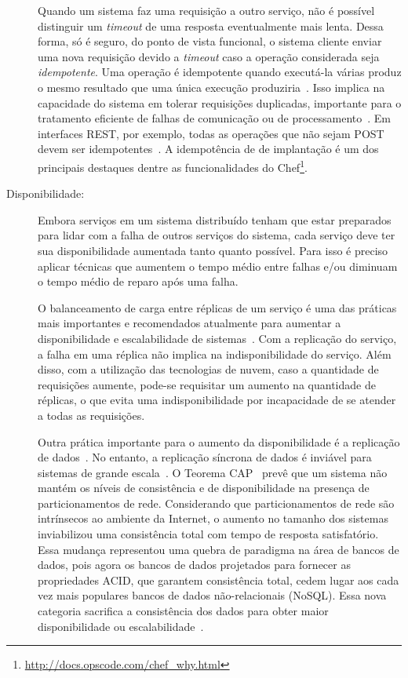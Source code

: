 \begin{description}
Quando um sistema faz uma requisição a outro serviço, não é possível distinguir um \emph{timeout} de uma resposta eventualmente mais lenta. Dessa forma, só é seguro, do ponto de vista funcional, o sistema cliente enviar uma nova requisição devido a \emph{timeout} caso a operação considerada seja \emph{idempotente}. 
Uma operação é idempotente quando executá-la várias produz o mesmo resultado 
que uma única execução produziria~\cite{Weider2007QoSWS}.
Isso implica na capacidade do sistema em tolerar requisições duplicadas,
importante para o tratamento eficiente de falhas de comunicação 
ou de processamento~\cite{Ramalingam2013Idempotence}.
Em interfaces REST, por exemplo, todas as operações que não sejam POST devem ser idempotentes~\cite{Allamaraju2010REST}. A idempotência de \scripts
de implantação é um dos principais destaques dentre as funcionalidades do 
Chef\footnote{\url{http://docs.opscode.com/chef_why.html}}.

\item [Disponibilidade:]

Embora serviços em um sistema distribuído tenham que estar preparados para lidar
com a falha de outros serviços do sistema,
cada serviço deve ter sua disponibilidade aumentada tanto quanto possível. 
Para isso é preciso aplicar técnicas que
aumentem o tempo médio entre falhas e/ou diminuam o tempo médio de reparo após uma falha.

O balanceamento de carga entre réplicas de um serviço é uma das práticas mais importantes e 
recomendados atualmente para aumentar a disponibilidade e escalabilidade de sistemas~\cite{Amazon2012Practices}.
Com a replicação do serviço, a falha em uma réplica não implica na indisponibilidade
do serviço. Além disso, com a utilização das tecnologias de nuvem,
caso a quantidade de requisições aumente, pode-se requisitar um aumento na quantidade de réplicas,
o que evita uma indisponibilidade por incapacidade de se atender a todas as requisições.

Outra prática importante para o aumento da disponibilidade é a replicação de dados~\cite{Brewer2001GiantScale}.
No entanto, a replicação síncrona de dados é inviável para sistemas de grande escala~\cite{Helland2009Quicksand}.
O Teorema CAP~\cite{Brewer2012Cap} prevê que um sistema não mantém os níveis de consistência e de disponibilidade na presença de particionamentos de rede. Considerando que particionamentos de rede são intrínsecos ao ambiente da Internet, o aumento no tamanho dos sistemas inviabilizou uma consistência total com tempo de resposta satisfatório. 
Essa mudança representou uma quebra de paradigma na área de bancos de dados,
pois agora os bancos de dados projetados para fornecer as propriedades ACID,
que garantem consistência total, cedem lugar aos cada vez mais populares
bancos de dados não-relacionais (NoSQL).
Essa nova categoria sacrifica a consistência dos dados para obter maior disponibilidade ou escalabilidade~\cite{Cattell2011NoSql}.


\end{description}
